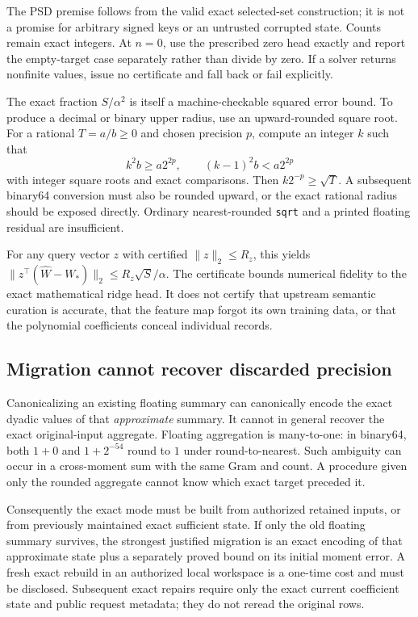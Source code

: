 The PSD premise follows from the valid exact selected-set construction; it
is not a promise for arbitrary signed keys or an untrusted corrupted state.
Counts remain exact integers. At $n=0$, use the prescribed zero head
exactly and report the empty-target case separately rather than divide by
zero. If a solver returns nonfinite values, issue no certificate and fall
back or fail explicitly.

The exact fraction $S/\alpha^2$ is itself a machine-checkable squared error
bound. To produce a decimal or binary upper radius, use an upward-rounded
square root. For a rational $T=a/b\ge0$ and chosen precision $p$, compute
an integer $k$ such that
\[
 k^2 b\ge a2^{2p},\qquad (k-1)^2b<a2^{2p}
\]
with integer square roots and exact comparisons. Then $k2^{-p}\ge\sqrt T$.
A subsequent binary64 conversion must also be rounded upward, or the exact
rational radius should be exposed directly. Ordinary nearest-rounded
\texttt{sqrt} and a printed floating residual are insufficient.

For any query vector $z$ with certified $\|z\|_2\le R_z$, this yields
$\|z^\top(\widehat W-W_*)\|_2\le R_z\sqrt{S}/\alpha$.
The certificate bounds numerical fidelity to the exact mathematical ridge
head. It does not certify that upstream semantic curation is accurate,
that the feature map forgot its own training data, or that the polynomial
coefficients conceal individual records.

\subsection{Migration cannot recover discarded precision}
Canonicalizing an existing floating summary can canonically encode the
exact dyadic values of that \emph{approximate} summary. It cannot in
general recover the exact original-input aggregate. Floating aggregation
is many-to-one: in binary64, both $1+0$ and $1+2^{-54}$ round to $1$ under
round-to-nearest. Such ambiguity can occur in a cross-moment sum with the
same Gram and count. A procedure given only the rounded aggregate cannot
know which exact target preceded it.

Consequently the exact mode must be built from authorized retained inputs,
or from previously maintained exact sufficient state. If only the old
floating summary survives, the strongest justified migration is an exact
encoding of that approximate state plus a separately proved bound on its
initial moment error. A fresh exact rebuild in an authorized local
workspace is a one-time cost and must be disclosed. Subsequent exact
repairs require only the exact current coefficient state and public request
metadata; they do not reread the original rows.
